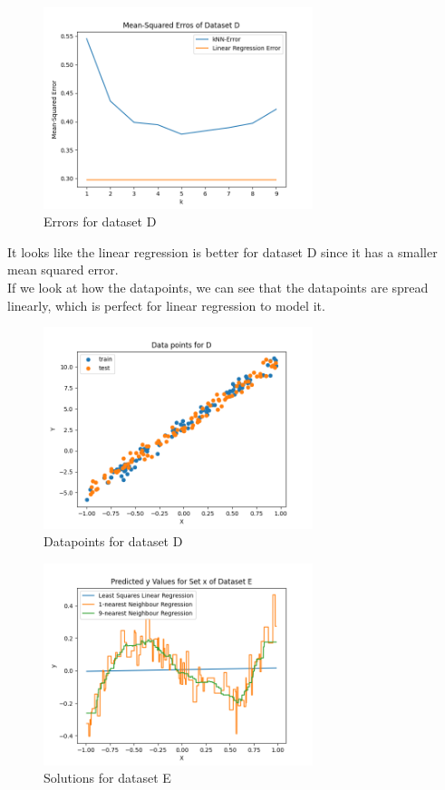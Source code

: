 \documentclass[10pt,letter,notitlepage]{article}
\newcounter{exercise}
\begin{document}
\begin{exercise}
\begin{enumerate}
{      \begin{figure}[H]
      \centering
      \includegraphics[width=0.7\textwidth]{Exercise4_dataset_D_error.png}
      \caption{Errors for dataset D}
      \end{figure}
      
      \color{orange}
      It looks like the linear regression is better for dataset D since it has a smaller mean squared error. \\
      If we look at how the datapoints, we can see that the datapoints are spread linearly, which is perfect for 
      linear regression to model it. 
      \begin{figure}[H]
      \centering
      \includegraphics[width=0.7\textwidth]{Exercise4_dataset_D_datapoints.png}
      \caption{Datapoints for dataset D}
      \end{figure}


      \begin{figure}[H]
      \centering
      \includegraphics[width=0.7\textwidth]{Exercise4_dataset_E_all_points.png}
      \caption{Solutions for dataset E}
      \end{figure}

}
\end{enumerate}
\end{exercise}
\end{document}
